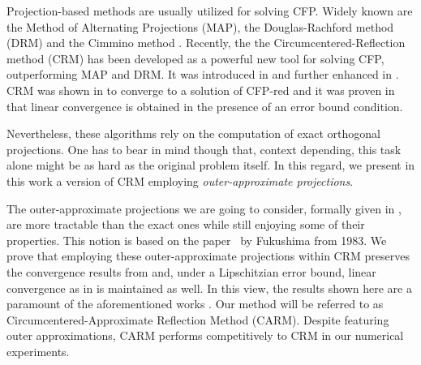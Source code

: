 \documentclass[smallextended,numbook,nospthms]{svjour3}
\theoremstyle{plain}
\theoremstyle{definition}
\def\RR{\mathds R}
\begin{document}

Projection-based methods are usually utilized for solving CFP. Widely known are the Method of Alternating Projections (MAP), the Douglas-Rachford method (DRM) and the Cimmino method \cite{Cimmino:1938tp}. Recently, the the Circumcentered-Reflection method (CRM) has been developed as a powerful new tool for solving CFP, outperforming MAP and DRM. It was introduced in \cite{Behling:2018a,Behling:2018} and further enhanced in \cite{Arefidamghani:2020,Bauschke:2018ut,Bauschke:2018wa, Bauschke:2019uh,Bauschke:2020a,Behling:2019dj,Behling:2020,Dizon:2019vq,Dizon:2020a,Ouyang:2018gu,Lindstrom:2020a}. CRM was shown in \cite{Behling:2020} to converge to a solution of CFP-red and it was proven in \cite{Arefidamghani:2020} that linear convergence is obtained in the presence of an error bound condition.

Nevertheless, these algorithms rely on the computation of exact orthogonal projections. One has to bear in mind though that, context depending, this task alone might be as hard as the original problem itself. In this regard, we present in this work a version of CRM employing \emph{outer-approximate projections}. 

The outer-approximate projections we are going to consider, formally given in , are more tractable than the exact ones while still enjoying some of their properties. This notion is based on the paper~\cite{Fukushima:1983} by Fukushima from 1983.  We prove that employing these outer-approximate projections within CRM preserves the convergence results from \cite{Behling:2020} and, under a Lipschitzian error bound, linear convergence as in \cite{Arefidamghani:2020} is maintained as well. In this view, the results shown here are a paramount of the aforementioned works \cite{Behling:2020, Arefidamghani:2020}. Our method will be referred to as Circumcentered-Approximate Reflection Method (CARM). Despite featuring outer approximations,  CARM performs competitively to CRM in our numerical experiments. 
\end{document}
